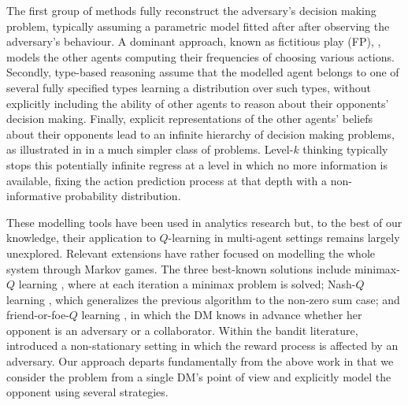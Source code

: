 The first group of methods fully reconstruct the adversary's decision
making problem, typically assuming a parametric model fitted after 
after observing the adversary's behaviour. A dominant approach,
known as fictitious play  (FP), \parencite{brown1951iterative}, models 
the other agents computing their frequencies of choosing various actions.
Secondly, %
type-based reasoning assume that the modelled agent belongs
to one of several fully specified types learning 
a distribution over such types, %
without explicitly including the ability of
other agents to reason about their opponents' decision making. 
Finally, explicit representations of the other agents' beliefs about their
opponents lead to an infinite hierarchy of decision making problems,
as illustrated in \parencite{rios2012adversarial} in a much simpler class of problems. Level-$k$ thinking  \parencite{stahl1994experimental} typically stops this potentially infinite regress at a level in which no more information is available, fixing the action prediction process at that depth with a non-informative probability distribution.

These modelling tools have been used in analytics 
research but, to the best
of our knowledge, their application to $Q$-learning in multi-agent settings remains 
largely unexplored. Relevant extensions %
have rather focused on modelling the whole system 
through Markov games. The three best-known solutions include minimax-$Q$ learning \parencite{littman1994markov}, where at each iteration a minimax 
problem is solved; Nash-$Q$ learning \parencite{hu2003nash}, 
which generalizes the previous algorithm to the non-zero sum case;
and friend-or-foe-$Q$ learning \parencite{littman2001friend}, in which the DM knows in advance whether her opponent is an adversary or a collaborator. Within the bandit literature, \parencite{auer1995gambling} introduced a non-stationary setting in which the reward process is affected by an adversary. Our approach departs fundamentally from the above
work in that we consider the problem from a single DM's point of view and 
explicitly model the opponent using several strategies.

